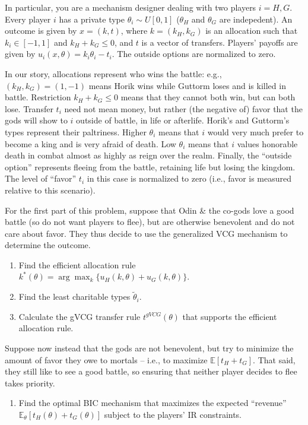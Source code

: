 \documentclass[a4paper]{article}
\begin{document}
In particular, you are a mechanism designer dealing with two players $i=H,G$. Every player $i$ has a private type $\theta_i \sim U[0,1]$ ($\theta_H$ and $\theta_G$ are indepedent). An outcome is given by $x=(k,t)$, where $k=(k_H,k_G)$ is an allocation such that $k_i \in [-1,1]$ and $k_H + k_G \leq 0$, and $t$ is a vector of transfers. Players' payoffs are given by $u_i(x,\theta) = k_i \theta_i - t_i$. The outside options are normalized to zero.

In our story, allocations represent who wins the battle: e.g., $(k_H,k_G)=(1,-1)$ means Horik wins while Guttorm loses and is killed in battle. Restriction $k_H + k_G \leq 0$ means that they cannot both win, but can both lose. Transfer $t_i$ need not mean money, but rather (the negative of) favor that the gods will show to $i$ outside of battle, in life or afterlife.
Horik's and Guttorm's types represent their paltriness. Higher $\theta_i$ means that $i$ would very much prefer to become a king and is very afraid of death. Low $\theta_i$ means that $i$ values honorable death in combat almost as highly as reign over the realm. Finally, the ``outside option'' represents fleeing from the battle, retaining life but losing the kingdom. The level of ``favor'' $t_i$ in this case is normalized to zero (i.e., favor is measured relative to this scenario).

For the first part of this problem, suppose that Odin \& the co-gods love a good battle (so do not want players to flee), but are otherwise benevolent and do not care about favor. They thus decide to use the generalized VCG mechanism to determine the outcome.

\begin{enumerate}
	\item Find the efficient allocation rule $k^*(\theta) = \arg \max_k \{u_H(k,\theta) + u_G(k,\theta)\}$.
	\item Find the least charitable types $\tilde{\theta}_i$.
	\item Calculate the gVCG transfer rule $t^{gVCG}(\theta)$ that supports the efficient allocation rule.
\end{enumerate}

Suppose now instead that the gods are not benevolent, but try to minimize the amount of favor they owe to mortals -- i.e., to maximize $\mathbb{E}[t_H+t_G]$. That said, they still like to see a good battle, so ensuring that neither player decides to flee takes priority.

\begin{enumerate}[resume]
	\item Find the optimal BIC mechanism that maximizes the expected ``revenue'' $\mathbb{E}_\theta[t_H(\theta)+t_G(\theta)]$ subject to the players' IR constraints.
\end{enumerate}
\end{document}
